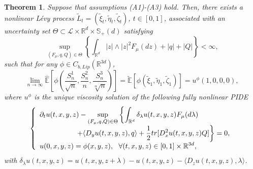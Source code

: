 \documentclass[a4paper,oneside,10pt]{article}%
\newtheorem{theorem}{Theorem}[section]
\numberwithin{equation}{section}
\begin{document}
\begin{theorem}
\label{main theorem} Suppose that assumptions (A1)-(A3) hold. Then, there
exists a nonlinear L\'evy process $\tilde{L}_{t}=(\tilde{\xi}_{t},\tilde{\eta
}_{t},\tilde{\zeta}_{t})$, $t\in[0,1]$, associated with an uncertainty set
$\Theta \subset \mathcal{L}\times \mathbb{R}^{d}\times \mathbb{S}_{+}(d)$
satisfying
\[
\sup_{(F_{\mu},q,Q)\in \Theta}\left \{  \int_{\mathbb{R}^{d}}|z|\wedge
|z|^{2}F_{\mu}(dz)+|q|+|Q|\right \}  <\infty,
\]
such that for any $\phi \in C_{b,Lip}(\mathbb{R}^{3d})$,
\[
\lim_{n\rightarrow \infty}\mathbb{\hat{E}}\left[  \phi \left(  \frac{S_{n}^{1}
}{\sqrt{n}},\frac{S_{n}^{2}}{n},\frac{S_{n}^{3}}{\sqrt[\alpha]{n}}\right)
\right]  = \mathbb{\tilde{E}}[\phi(\tilde{\xi}_{1},\tilde{\eta}_{1},
\tilde{\zeta}_{1})]=u^{\phi}(1,0,0,0),
\]
where $u^{\phi}$ is the unique viscosity solution of the following fully
nonlinear PIDE
\begin{equation}
\left \{
\begin{array}
[c]{l}%
\displaystyle \partial_{t}u(t,x,y,z)-\sup \limits_{(F_{\mu},q,Q)\in \Theta
}\left \{  \int_{\mathbb{R}^{d}}\delta_{\lambda}u(t,x,y,z)F_{\mu}(d\lambda)
\right. \\
\displaystyle \text{\  \  \  \  \  \  \  \  \  \  \  \  \  \  \ }\left.  +\langle
D_{y}u(t,x,y,z),q\rangle+\frac{1}{2}tr[D_{x}^{2}u(t,x,y,z)Q]\right \}  =0,\\
\displaystyle u(0,x,y,z)=\phi(x,y,z),\text{ \ }\forall(t,x,y,z)\in
[0,1]\times \mathbb{R}^{3d},
\end{array}
\right.  \label{PIDE}%
\end{equation}
with $\delta_{\lambda}u(t,x,y,z)=u(t,x,y,z+\lambda)-u(t,x,y,z)-\langle
D_{z}u(t,x,y,z),\lambda \rangle$.


\end{theorem}
\end{document}
